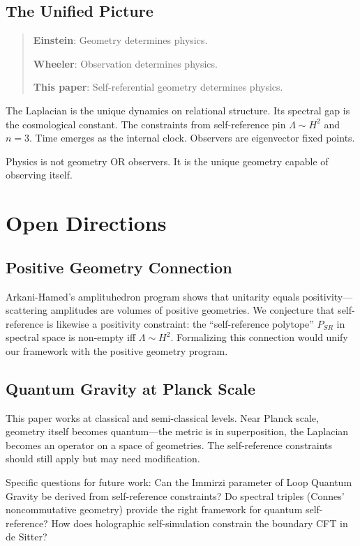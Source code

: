 \documentclass[11pt,a4paper]{article}
\theoremstyle{definition}
\theoremstyle{remark}
\begin{document}
\subsection{The Unified Picture}

\begin{quote}
\textbf{Einstein}: Geometry determines physics.

\textbf{Wheeler}: Observation determines physics.

\textbf{This paper}: Self-referential geometry determines physics.
\end{quote}

The Laplacian is the unique dynamics on relational structure. Its spectral gap is the cosmological constant. The constraints from self-reference pin $\Lambda \sim H^2$ and $n = 3$. Time emerges as the internal clock. Observers are eigenvector fixed points.

Physics is not geometry OR observers. It is the unique geometry capable of observing itself.

\section{Open Directions}

\subsection{Positive Geometry Connection}

Arkani-Hamed's amplituhedron program shows that unitarity equals positivity---scattering amplitudes are volumes of positive geometries. We conjecture that self-reference is likewise a positivity constraint: the ``self-reference polytope'' $P_{SR}$ in spectral space is non-empty iff $\Lambda \sim H^2$. Formalizing this connection would unify our framework with the positive geometry program.

\subsection{Quantum Gravity at Planck Scale}

This paper works at classical and semi-classical levels. Near Planck scale, geometry itself becomes quantum---the metric is in superposition, the Laplacian becomes an operator on a space of geometries. The self-reference constraints should still apply but may need modification.

Specific questions for future work: Can the Immirzi parameter of Loop Quantum Gravity be derived from self-reference constraints? Do spectral triples (Connes' noncommutative geometry) provide the right framework for quantum self-reference? How does holographic self-simulation constrain the boundary CFT in de Sitter?
\end{document}
